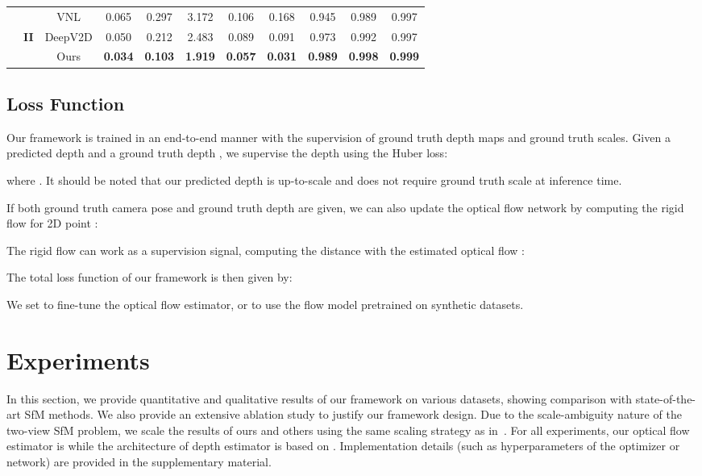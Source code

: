\documentclass[final]{cvpr}
\begin{document}
\begin{table*}[tp]
\begin{tabular}{c| c | c || c | c | c |c| c | c | c | c }
& & VNL \cite{yin2019enforcing}  &0.065&0.297& 3.172 &0.106&0.168& 0.945 &0.989 & 0.997 \\ 
\cline{2-11}
&\textbf{II} & DeepV2D\cite{teed2018deepv2d}  & 0.050 & 0.212& 2.483 & 0.089 & 0.091 & 0.973& 0.992 & 0.997 \\ \cline{2-11}
& & Ours  & \textbf{0.034} &\textbf{0.103}& \textbf{1.919} & \textbf{0.057} &\textbf{0.031}& \textbf{0.989}& \textbf{0.998}& \textbf{0.999}\\
 \hline
\end{tabular}
\label{tab:kitti_depth}
\vspace{-2mm}
\end{table*}





\subsection{Loss Function}

Our framework is trained in an end-to-end manner with the supervision of ground truth depth maps and ground truth scales. Given a predicted depth  and a ground truth depth , we supervise the depth using the Huber loss:

where .
It should be noted that our predicted depth is up-to-scale and does not require ground truth scale at inference time.

If both ground truth camera pose  and ground truth depth  are given, we can also update the optical flow network by computing the rigid flow  for 2D point :


The rigid flow can work as a supervision signal, computing the  distance with the estimated optical flow :


The total loss function of our framework is then given by:

We set  to fine-tune the optical flow estimator, or  to use the flow model pretrained on synthetic datasets.






\section{Experiments}

In this section, we provide quantitative and qualitative results of our framework on various datasets, showing comparison with state-of-the-art SfM methods. We also provide an extensive ablation study to justify our framework design. Due to the scale-ambiguity nature of the two-view SfM problem, we scale the results of ours and others using the same scaling strategy as in~\cite{teed2018deepv2d,tang2018ba}. 
For all experiments, our optical flow estimator is \cite{zhong2020nipsflow} while the architecture of depth estimator is based on \cite{im2019dpsnet}. Implementation details (such as hyperparameters of the optimizer or network) are provided in the supplementary material.
\end{document}
